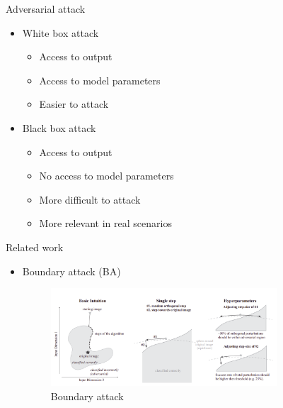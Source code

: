 \documentclass[11pt,t]{beamer}
\begin{document}
\begin{frame}{Adversarial attack}
\begin{itemize}
	\item White box attack
	\begin{itemize}
		\item Access to output
		\item Access to model parameters
		\item Easier to attack
	\end{itemize}
	\item Black box attack
	\begin{itemize}
		\item Access to output
		\item \alert{No} access to model parameters
		\item More difficult to attack
		\item More relevant in real scenarios
	\end{itemize}
\end{itemize}
\end{frame}


\begin{frame}{Related work}
\begin{itemize}
	\item Boundary attack (BA)
	\vspace{6pt}
	\begin{figure}
	\centering
	\includegraphics[width=0.8\textwidth]{graphics/boundary_attack.png}
	\caption{Boundary attack \cite{brendel2018decisionbased}\label{fig:boundary_attack}}
	\footnotesize
	\flushleft
	\end{figure}
\end{itemize}

\end{frame}
\end{document}
